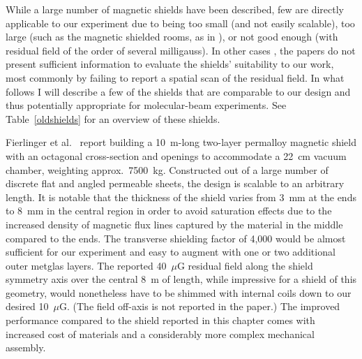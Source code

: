 While a large number of magnetic shields have been described, few are directly
applicable to our experiment due to being too small (and not easily scalable),
too large (such as the magnetic shielded rooms, as in \cite{altarev2015large}),
or not good enough (with residual field of the order of several milligauss). In
other cases \cite{sasada1988effective, sasada1996large, sasada1996performance,
sasada2000design, nagashima2002high}, the papers do not present sufficient
information to evaluate the shields' suitability to our work, most commonly by
failing to report a spatial scan of the residual field. In what follows I will
describe a few of the shields that are comparable to our design and thus
potentially appropriate for molecular-beam experiments. See
Table~\ref{oldshields} for an overview of these shields.

Fierlinger et al.\ \cite{wodey2020scalable} report building a 10~m-long two-layer
permalloy magnetic shield with an octagonal cross-section and openings to
accommodate a 22~cm vacuum chamber, weighting approx.\ 7500~kg. Constructed out
of a large number of discrete flat and angled permeable sheets, the design is
scalable to an arbitrary length. It is notable that the thickness of the shield
varies from 3~mm at the ends to 8~mm in the central region in order to avoid
saturation effects due to the increased density of magnetic flux lines captured
by the material in the middle compared to the ends. The transverse shielding
factor of 4,000 would be almost sufficient for our experiment and easy to
augment with one or two additional outer metglas layers. The reported 40~$\mu$G
residual field along the shield symmetry axis over the central 8~m of length,
while impressive for a shield of this geometry, would nonetheless have to be
shimmed with internal coils down to our desired 10~$\mu$G. (The field off-axis
is not reported in the paper.) The improved performance compared to the shield
reported in this chapter comes with increased cost of materials and a
considerably more complex mechanical assembly.

